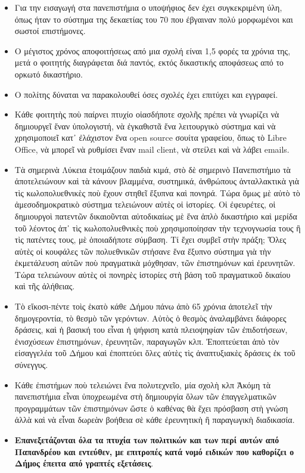 \documentclass[a4paper]{article}
\begin{document}
\begin{itemize}
\item Για την εισαγωγή στα πανεπιστήμια ο υποψήφιος δεν έχει συγκεκριμένη ύλη, όπως ήταν το σύστημα της δεκαετίας του 70 που έβγαιναν πολύ μορφωμένοι και σωστοί επιστήμονες.
\item Ο μέγιστος χρόνος αποφοιτήσεως από μια σχολή είναι 1,5 φορές τα χρόνια της, μετά ο φοιτητής διαγράφεται διά παντός, εκτός δικαστικής αποφάσεως από το ορκωτό δικαστήριο.
\item Ο πολίτης δύναται να παρακολουθεί όσες σχολές έχει επιτύχει και εγγραφεί.
\item Κάθε φοιτητὴς ποὺ παίρνει πτυχίο οἱασδήποτε σχολῆς πρέπει νὰ γνωρίζει νὰ δημιουργεῖ ἕναν ὑπολογιστή, νὰ ἐγκαθιστᾶ ἕνα λειτουργικὸ σύστημα καὶ νὰ χρησιμοποιεῖ κατ᾿ ἐλάχιστον ἕνα open source σουίτα γραφείου, ὅπως τὸ Libre Office, νὰ μπορεῖ νὰ ρυθμίσει ἕναν mail client, νὰ στείλει καὶ νὰ λάβει emails.
\item Τὰ σημερινὰ Λύκεια ἑτοιμάζουν παιδιὰ κιμά, στὸ δὲ σημερινὸ Πανεπιστήμιο τὰ ἀποτελειώνουν καὶ τὰ κάνουν βλαμμένα, συστημικά, ἀνθρώπους ἀνταλλακτικὰ γιὰ τὶς κωλοπολυεθνικὲς ποὺ ἔχουν στηθεῖ ἔξυπνα καὶ πονηρά. Τώρα ὅμως μὲ αὐτὸ τὸ ἀμεσοδημοκρατικὸ σύστημα τελειώνουν αὐτὲς οἱ ἱστορίες. Οἱ ἐφευρέτες, οἱ δημιουργοὶ πατεντῶν δικαιοῦνται αὐτοδικαίως μὲ ἕνα ἁπλὸ δικαστήριο καὶ μερίδα τοῦ λέοντος ἀπ᾿ τὶς κωλοπολυεθνικὲς ποὺ χρησιμοποίησαν τὴν τεχνογνωσία τους ἢ τὶς πατέντες τους, μὲ ὁποιαδήποτε σύμβαση. Τί ἔχει συμβεῖ στὴν πράξη; Ὅλες αὐτὲς οἱ κουφάλες τῶν πολυεθνικῶν στήσανε ἕνα ἔξυπνο σύστημα γιὰ τὴν ἐκμετάλευση αὐτῶν ποὺ πραγματικὰ μόχθησαν, τῶν ἐπιστημόνων καὶ ἐρευνητῶν. Τώρα τελειώνουν αὐτὲς οἱ πονηρὲς ἱστορίες στὴ βάση τοῦ πραγματικοῦ δικαίου καὶ τῆς ἀλήθειας.
\item Τὸ εἴκοσι-πέντε τοὶς ἑκατὸ κάθε Δήμου πάνω ἀπὸ 65 χρόνια ἀποτελεῖ τὴν δημογεροντία, τὸ θεσμὸ τῶν γερόντων. Αὐτὸς ὁ θεσμὸς ἀναλαμβάνει διάφορες δράσεις, καὶ ἡ βασική του εἶναι ἡ ψήφιση κατὰ πλειοψηφίαν τῶν ἐπιδοτήσεων, ἐνισχύσεων ἐπιστημόνων, ἐρευνητῶν, παραγωγῶν κλπ. Ἐποπτεύεται ἀπὸ τὸν εἰσαγγελέα τοῦ Δήμου καὶ ἐποπτεύει ὅλες αὐτὲς τὶς ἀναπτυξιακὲς δράσεις ἐκ τοῦ σύνεγγυς.
\item Κάθε ἐπιστήμων ποὺ τελειώνει ἕνα πολυτεχνεῖο, μία σχολὴ κλπ Ἀκόμη τὰ πανεπιστήμια εἶναι ὑποχρεωμένα στὴ δημιουργία ὅλων τῶν ἐπαγγελματικῶν προγραμμάτων τῶν ἐπιστημόνων ὥστε ὁ καθένας θὰ ἔχει πρόσβαση στὴ γνώση ἀλλὰ καὶ νὰ εἶναι δωρεὰν βοήθεια σὲ κάθε ἐρευνητικὴ ἢ παραγωγικὴ διαδικασία.
\item \textbf{Επανεξετάζονται όλα τα πτυχία των πολιτικών και των περί αυτών  από Παπανδρέου και εντεύθεν, με επιτροπές κατά νομό ειδικών που καθορίζει ο Δήμος έπειτα από γραπτές εξετάσεις}.

\end{itemize}
\end{document}
